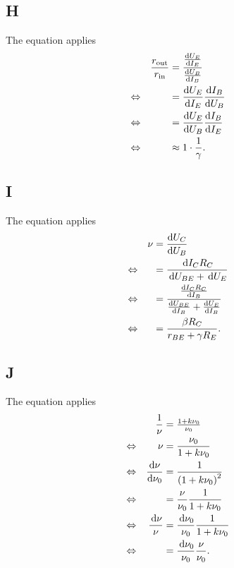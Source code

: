 \documentclass[a4paper,10pt]{article}
\newcommand{\td}{\,\text{d}}
\numberwithin{equation}{section}
\begin{document}
\begin{multicols}{2}
	\subsection{H}
        The equation applies
	\begin{align}
		                &  & \dfrac{r_\text{out}}{r_\text{in}} & = \dfrac{\diff[]{U_E}{I_E}}{\diff[]{U_B}{I_B}} &  &           \\
		\Leftrightarrow &  &                                   & = \diff[]{U_E}{I_E}\diff[]{I_B}{U_B}           &  & \nonumber \\
		\Leftrightarrow &  &                                   & = \diff[]{U_E}{U_B}\diff[]{I_B}{I_E}           &  & \nonumber \\
		\Leftrightarrow &  &                                   & \approx 1\cdot \dfrac{1}{\gamma }.             &  &
	\end{align}

	\subsection{I}
        The equation applies
	\begin{align}
		                &  & \nu  & = \diff[]{U_C}{U_B}                                                    &  &           \\
		\Leftrightarrow &  &   & = \dfrac{\td I_CR_C}{\td U_{BE}+\td U_E}                               &  & \nonumber \\
		\Leftrightarrow &  &   & = \dfrac{\diff[]{I_CR_C}{I_B}}{\diff[]{U_{BE}}{I_B}+\diff[]{U_E}{I_B}} &  & \nonumber \\
		\Leftrightarrow &  &   & = \dfrac{\beta R_C}{r_{BE}+\gamma R_E}.                                &  &
	\end{align}

	\subsection{J}
        The equation applies
	\begin{align}
		                &  & \dfrac{1}{\nu}     & = \tfrac{1+k\nu _0}{\nu _0}                   &  &           \\
		\Leftrightarrow &  & \nu                & = \dfrac{\nu_0}{1+k\nu_0}                   &  & \nonumber \\
		\Leftrightarrow &  & \diff[]{\nu}{\nu_0}  & = \dfrac{1}{\left(1+k\nu_0\right)^2}      &  & \nonumber \\
		\Leftrightarrow &  &                  & = \dfrac{\nu}{\nu_0}\dfrac{1}{1+k\nu_0}       &  & \nonumber \\
		\Leftrightarrow &  & \dfrac{\td \nu}{\nu} & = \dfrac{\td \nu_0}{\nu_0}\dfrac{1}{1+k\nu_0} &  & \nonumber \\
		\Leftrightarrow &  &                  & = \dfrac{\td \nu_0}{\nu_0}\dfrac{\nu}{\nu_0}.   &  &
	\end{align}


\end{multicols}
\end{document}
